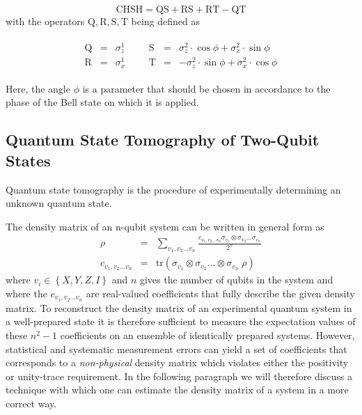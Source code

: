 \begin{equation}
\mathrm{CHSH} = \mathrm{QS}+\mathrm{RS}+\mathrm{RT}-\mathrm{QT}
\end{equation}
with the operators $\mathrm{Q,R,S,T}$ being defined as

\begin{eqnarray}
	\begin{array}{cccccccc}
		\mathrm{Q} & = & \sigma_z^1 &&& \mathrm{S} & = & \sigma_z^2\cdot \cos{\phi}+\sigma_x^2 \cdot \sin{\phi} \\
		\mathrm{R} & = & \sigma_x^1 &&& \mathrm{T} & = & -\sigma_z^2\cdot \sin{\phi}+\sigma_x^2 \cdot \cos{\phi}
	\end{array}
\end{eqnarray} 

Here, the angle $\phi$ is a parameter that should be chosen in accordance to the phase of the Bell state on which it is applied.

\subsection{Quantum State Tomography of Two-Qubit States}

Quantum state tomography is the procedure of experimentally determining an unknown quantum state\cite{nielsen_quantum_2000}.

The density matrix of an n-qubit system can be written in general form as
\begin{eqnarray}
\rho & = & \sum\limits_{v_1,v_2\hdots v_n} \frac{c_{v_1,v_2\hdots v_n} \sigma_{v_1}\otimes \sigma_{v_2}\hdots \sigma_{v_n}}{2^n} \label{eq:state_tomography_state_representation} \\
c_{v_1,v_2\hdots v_n} & = & \mathrm{tr}\left(\sigma_{v_1}\otimes \sigma_{v_2}\hdots \otimes\sigma_{v_n} \; \rho \right)  \label{eq:state_tomography_coefficients}
\end{eqnarray}
where $v_i \in \left\{ X,Y,Z,I\right\}$ and $n$ gives the number of qubits in the system and where the $c_{v_1,v_2\hdots v_n}$ are real-valued coefficients that fully describe the given density matrix. To reconstruct the density matrix of an experimental quantum system in a well-prepared state it is therefore sufficient to measure the expectation values of these $n^2-1$ coefficients on an ensemble of identically prepared systems. However, statistical and systematic measurement errors can yield a set of coefficients that corresponds to a {\it non-physical} density matrix which violates either the positivity or unity-trace requirement. In the following paragraph we will therefore discuss a technique with which one can estimate the density matrix of a system in a more correct way.

